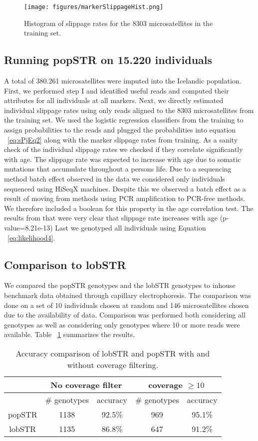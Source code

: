 \documentclass{bioinfo}
\begin{document}
\begin{figure}[H]
\centering
 \texttt{[image: figures/markerSlippageHist.png]}
  \caption[Histogram of marker-slippage]{Histogram of slippage rates for the 8303 microsatellites in the training set.}
 \label{fig:markerSlipp}
\end{figure}

\subsection{Running popSTR on 15.220 individuals}
A total of 380.261 microsatellites were imputed into the Icelandic population.
First, we performed step I and identified useful reads and computed their attributes for all individuals at all markers. Next, we directly estimated individual slippage rates using only reads aligned to the 8303 microsatellites from the training set. We used the logistic regression classifiers from the training to assign probabilities to the reads and plugged the probabilities into equation ~\ref{eq:sPjEq2} along with the marker slippage rates from training. 
As a sanity check of the individual slippage rates we checked if they correlate significantly with age. The slippage rate was expected to increase with age due to somatic mutations that accumulate throughout a persons life. Due to a sequencing method batch effect observed in the data we considered only individuals sequenced using HiSeqX machines. Despite this we observed a batch effect as a result of moving from methods using PCR amplification to PCR-free methods. We therefore included a boolean for this property in the age correlation test. The results from that were very clear that slippage rate increases with age (p-value=8.21e-13)
Last we genotyped all individuals using Equation ~\ref{eq:likelihood4}.

\subsection{Comparison to lobSTR}
We compared the popSTR genotypes and the lobSTR genotypes to inhouse benchmark data obtained through capillary electrophoresis. The comparison was done on a set of 10 individuals chosen at random and 146 microsatellites chosen due to the availability of data. 
Comparison was performed both considering all genotypes as well as considering only genotypes where 10 or more reads were available. Table ~\ref{table:lobSTRcomp} summarizes the results. 
\begin{table}[H]
    \caption{Accuracy comparison of lobSTR and popSTR with and without coverage filtering.}
    \begin{tabular}{ c | c | c | c | c |}
         & \multicolumn{2}{c}{No coverage filter} & \multicolumn{2}{c}{coverage $ \geq 10$} \\
         \hline
         & \# genotypes & accuracy & \# genotypes & accuracy \\
         \hline
        popSTR & 1138 & 92.5\% & 969 & 95.1\% \\
        \hline
        lobSTR & 1135 & 86.8\% & 647 & 91.2\% \\
        \hline
    \end{tabular}
    \label{table:lobSTRcomp}
\end{table}
\end{document}
